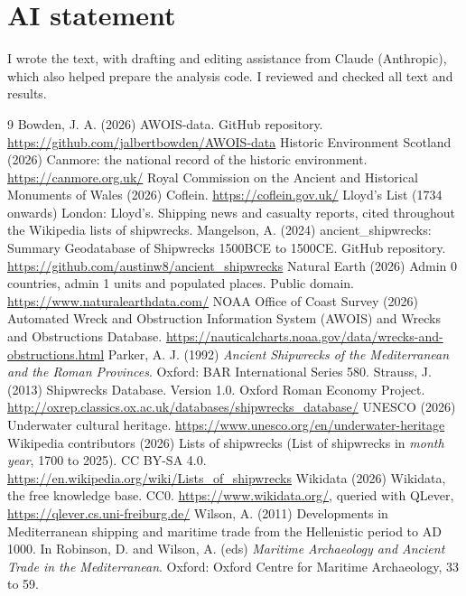\documentclass[11pt,a4paper]{article}
\begin{document}
\section*{AI statement}
I wrote the text, with drafting and editing assistance from Claude (Anthropic), which also helped prepare the analysis code. I reviewed and checked all text and results.

\begin{thebibliography}{9}
 Bowden, J. A. (2026) AWOIS-data. GitHub repository. \url{https://github.com/jalbertbowden/AWOIS-data}
 Historic Environment Scotland (2026) Canmore: the national record of the historic environment. \url{https://canmore.org.uk/}
 Royal Commission on the Ancient and Historical Monuments of Wales (2026) Coflein. \url{https://coflein.gov.uk/}
 Lloyd's List (1734 onwards) London: Lloyd's. Shipping news and casualty reports, cited throughout the Wikipedia lists of shipwrecks.
 Mangelson, A. (2024) ancient\_shipwrecks: Summary Geodatabase of Shipwrecks 1500BCE to 1500CE. GitHub repository. \url{https://github.com/austinw8/ancient_shipwrecks}
 Natural Earth (2026) Admin 0 countries, admin 1 units and populated places. Public domain. \url{https://www.naturalearthdata.com/}
 NOAA Office of Coast Survey (2026) Automated Wreck and Obstruction Information System (AWOIS) and Wrecks and Obstructions Database. \url{https://nauticalcharts.noaa.gov/data/wrecks-and-obstructions.html}
 Parker, A. J. (1992) \emph{Ancient Shipwrecks of the Mediterranean and the Roman Provinces}. Oxford: BAR International Series 580.
 Strauss, J. (2013) Shipwrecks Database. Version 1.0. Oxford Roman Economy Project. \url{http://oxrep.classics.ox.ac.uk/databases/shipwrecks_database/}
 UNESCO (2026) Underwater cultural heritage. \url{https://www.unesco.org/en/underwater-heritage}
 Wikipedia contributors (2026) Lists of shipwrecks (List of shipwrecks in \emph{month year}, 1700 to 2025). CC BY-SA 4.0. \url{https://en.wikipedia.org/wiki/Lists_of_shipwrecks}
 Wikidata (2026) Wikidata, the free knowledge base. CC0. \url{https://www.wikidata.org/}, queried with QLever, \url{https://qlever.cs.uni-freiburg.de/}
 Wilson, A. (2011) Developments in Mediterranean shipping and maritime trade from the Hellenistic period to AD 1000. In Robinson, D. and Wilson, A. (eds) \emph{Maritime Archaeology and Ancient Trade in the Mediterranean}. Oxford: Oxford Centre for Maritime Archaeology, 33 to 59.
\end{thebibliography}
\end{document}
